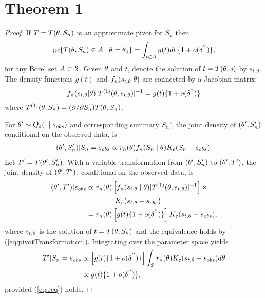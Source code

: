 \section{Theorem 1} 
\begin{proof} If $T=T({}{\theta}, S_n)$ is an approximate pivot for $S_n$ then 
\begin{equation}\label{eq:AW}
		\text{pr}\{T({}{\theta}, S_{n}) \in A \mid {}{\theta} = {}{\theta}_0\} =  \int_{t \in A}
		g(t) d t \,  \{1 + o(\delta^{''})\}, 
\end{equation}
for any Borel set $A \subset {\cal S} $. Given ${}{\theta}$ and $t$, denote the solution of $t = T( {}{\theta}, s)$ by $s_{t, \theta}$. The density functions $g(t)$ and $f_n(s_{t, \theta}|{}{\theta})$ are connected by a Jacobian matrix: 
		\begin{equation}\label{eq:pivotTransformation}
		f_n(s_{t, \theta}|{}{\theta}) |T^{(1)}( {}{\theta}, s_{t, \theta})|^{-1} = g(t) \{1 + o(\delta^{''})\}
		\end{equation}
where $T^{(1)}( {}{\theta}, S_n) = (\partial / \partial S_n)  T({}{\theta}, S_n)$. 
		
For $\theta' \sim Q_{\varepsilon}(\cdot \mid s_{obs})$ and corresponding summary $S_n'$, 
the joint density of $({}{\theta}', S_{n}')$  conditional on the observed data, is
	\begin{align*}
	({}{\theta}', S_{n}') | S_n=  s_{\relax obs} \propto  r_{n}({}{\theta}) f_n( S_n \mid{}{\theta}) K_{\varepsilon}(S_n - s_{\relax obs}).
	\end{align*}
Let $T' = T({}{\theta}', S_{n}')$. With a variable transformation from $({}{\theta}', S_{n}')$ to $({}{\theta}', T')$, the joint density of $({}{\theta}', T')$, conditional on the observed data, is
	\begin{align*}
	({}{\theta}', T') |  s_{\relax obs} & \propto  r_{n}({}{\theta}) \left[ f_n(s_{t,{}{\theta}}\mid{}{\theta}) |T^{(1)}( {}{\theta}, s_{t, {}{\theta}})|^{-1} \right] \times\\ 
	&\qquad\qquad K_{\varepsilon}(s_{t, {}{\theta}}-s_{\relax obs})\\ 
	& =   r_{n}({}{\theta}) \left[ g(t)  \{1 + o(\delta^{''})\} \right] K_{\varepsilon}(s_{t, {}{\theta}}-s_{\relax obs}),
	\end{align*}
where $s_{t, {}{\theta}}$ is the solution of  $t = T( {}{\theta}, S_n)$ %
and the equivalence holds by (\ref{eq:pivotTransformation}). Integrating over the parameter space yields
	\begin{align*}
	T' | S_n= s_{\relax obs}  &\propto \left[ g(t)  \{1 + o(\delta^{''})\} \right] \int_{\cal{P}}  r_{n}(\theta)  K_{\varepsilon}(s_{t, \theta}-s_{\relax obs}) d {}{\theta} \\
	&\propto g(t) \{1 + o(\delta^{''})\},
	\end{align*} 
provided (\ref{eq:req}) holds. 
		

\end{proof}
